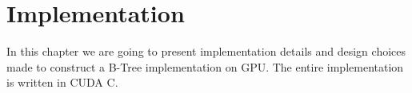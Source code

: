 \documentclass{article}
\newcommand{\CC}{C\nolinebreak[4]\hspace{-.05em}\raisebox{.4ex}{\relsize{-3}{\textbf{++}}}}
\theoremstyle{definition}
\theoremstyle{remark}
\theoremstyle{remark}
\begin{document}








% 

% 

\section{Implementation}

In this chapter we are going to present implementation details and design choices made to construct a B-Tree implementation on GPU. The entire implementation is written in CUDA \CC.











\printbibliography
\end{document}
